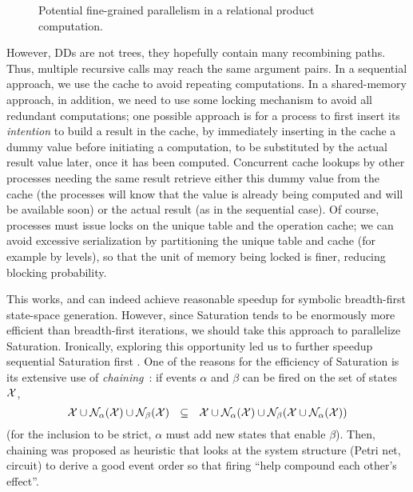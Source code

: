 \documentclass[copyright,creativecommons]{eptcs}
\newcommand{\CENTERPSSCALE}[2]{\begin{center}\mbox{\epsfig{file=#1.eps, scale=#2}}\end{center}}
\begin{document}
\begin{figure}
\begin{center}
\CENTERPSSCALE{pardis-fine-grain}{0.74}
\end{center}
\caption{Potential fine-grained parallelism in a relational product computation.}
\label{FIG:pardis-fine-grain}
\end{figure}


However, DDs are not trees, they hopefully contain many
recombining paths. Thus, multiple recursive calls may reach the same
argument pairs.
In a sequential approach, we use the cache
to avoid repeating computations. In a shared-memory approach, in
addition, we need to use some locking mechanism to avoid all
redundant computations; one possible approach is for a process to
first insert its \emph{intention} to build a result in the cache, by
immediately inserting in the cache a dummy value before initiating a
computation, to be substituted by the actual result value later,
once it has been computed.
Concurrent cache lookups by other processes needing the same result
retrieve either this dummy value from the cache
(the processes will know that the value is
already being computed and will be available soon) or the actual
result (as in the sequential case).
Of course, processes must issue locks on the unique table and the operation
cache; we can avoid excessive serialization by partitioning
the unique table and cache (for example by levels),
so that the unit of memory being locked is finer, reducing blocking probability.

This works, and can indeed achieve reasonable speedup for symbolic
breadth-first state-space generation.
However, since Saturation tends to be enormously more efficient than
breadth-first iterations, we should take this approach to
parallelize Saturation. Ironically, exploring this opportunity led
us to further speedup sequential Saturation first
\cite{2006ATVA-Chaining}. One of the reasons for the efficiency of
Saturation is its extensive use of \emph{chaining}~\cite{Roig1995}:
if events $\alpha$ and $\beta$ can be fired on the set of states
$\mathcal{X}$,
$$\mathcal{X} \cup \mathcal{N}_{\alpha}(\mathcal{X}) \cup \mathcal{N}_{\beta}(\mathcal{X})
   ~~ \subseteq  ~~
\mathcal{X} \cup \mathcal{N}_{\alpha}(\mathcal{X}) \cup
\mathcal{N}_{\beta}(\mathcal{X} \cup \mathcal{N}_{\alpha}(\mathcal{X}))$$
(for the inclusion to be strict, $\alpha$ must add new states that
enable $\beta$).
Then, chaining was proposed as heuristic that looks at the system structure
(Petri net, circuit) to derive a good event order so that firing
``help compound each other's effect''.
\end{document}
